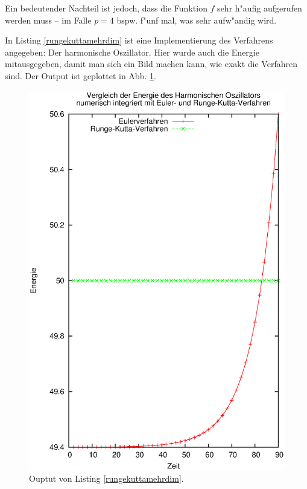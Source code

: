 \documentclass[a4paper]{book}
\begin{document}
Ein bedeutender Nachteil ist jedoch, dass die Funktion $f$ sehr
h"aufig aufgerufen werden muss -- im Falle $p=4$ bspw. f"unf mal, was
sehr aufw"andig wird.

In Listing
\ref{rungekuttamehrdim}
ist eine Implementierung des Verfahrens angegeben: Der harmonische
Oszillator. Hier wurde auch die Energie mitausgegeben, damit man sich
ein Bild machen kann, wie exakt die Verfahren sind. Der Output ist
geplottet in Abb. \ref{fig:rungekuttamehrdim-output}.




\begin{figure}
  \centering
  \includegraphics[width=\textwidth]{bilder/einschrmehrdimA01-1}
  \caption{Ouptut von Listing \ref{rungekuttamehrdim}.}
  \label{fig:rungekuttamehrdim-output}
\end{figure}
\end{document}

